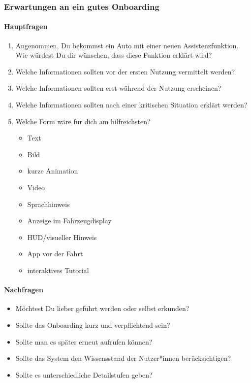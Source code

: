 \subsubsection{Erwartungen an ein gutes Onboarding}

\paragraph*{Hauptfragen}

\begin{enumerate}
    \item Angenommen, Du bekommst ein Auto mit einer neuen
          Assistenzfunktion. Wie würdest Du dir wünschen, dass diese
          Funktion erklärt wird?

    \item Welche Informationen sollten vor der ersten Nutzung
          vermittelt werden?

    \item Welche Informationen sollten erst während der Nutzung
          erscheinen?

    \item Welche Informationen sollten nach einer kritischen Situation
          erklärt werden?

    \item Welche Form wäre für dich am hilfreichsten?

    \begin{itemize}
        \item Text
        \item Bild
        \item kurze Animation
        \item Video
        \item Sprachhinweis
        \item Anzeige im Fahrzeugdisplay
        \item HUD/visueller Hinweis
        \item App vor der Fahrt
        \item interaktives Tutorial
    \end{itemize}
\end{enumerate}

\paragraph*{Nachfragen}

\begin{itemize}
    \item Möchtest Du lieber geführt werden oder selbst erkunden?
    \item Sollte das Onboarding kurz und verpflichtend sein?
    \item Sollte man es später erneut aufrufen können?
    \item Sollte das System den Wissensstand der Nutzer*innen
          berücksichtigen?
    \item Sollte es unterschiedliche Detailstufen geben?
\end{itemize}



